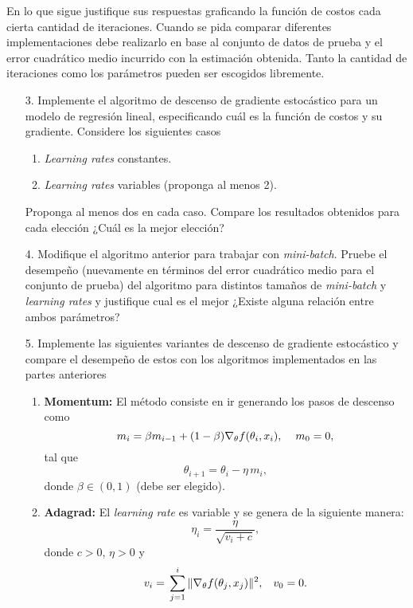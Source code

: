En lo que sigue justifique sus respuestas graficando la función de costos cada cierta cantidad de iteraciones. Cuando se pida comparar diferentes implementaciones debe realizarlo en base al conjunto de datos de prueba y el error cuadrático medio incurrido con la estimación obtenida. Tanto la cantidad de iteraciones como los parámetros pueden ser escogidos libremente.
\begin{enumerate}
  \item[3.] Implemente el algoritmo de descenso de gradiente estocástico para un modelo de regresión lineal, especificando cuál es la función de costos y su gradiente. Considere los siguientes casos
    \begin{enumerate}
      \item \emph{Learning rates} constantes.
      \item \emph{Learning rates} variables (proponga al menos 2).
    \end{enumerate}
    Proponga al menos dos en cada caso. Compare los resultados obtenidos para cada elección ¿Cuál es la mejor elección?
   
  \item[4.] Modifique el algoritmo anterior para trabajar con \emph{mini-batch}. Pruebe el desempeño (nuevamente en términos del error cuadrático medio para el conjunto de prueba) del algoritmo para distintos tamaños de \emph{mini-batch} y \emph{learning rates} y justifique cual es el mejor ¿Existe alguna relación entre ambos parámetros?
    
  \item[5.] Implemente las siguientes variantes de descenso de gradiente estocástico y compare el desempeño de estos con los algoritmos implementados en las partes anteriores
    \begin{enumerate}
        \item \textbf{Momentum:} El método consiste en ir generando los pasos de descenso como
          \[m_{i} = \beta m_{i-1} + (1-\beta)\nabla_{\theta}f(\theta_i,x_{i}),\hspace{0.4cm}m_0 = 0, \]
        tal que
        \[\theta_{i+1} = \theta_i -\eta\, m_i,\]
        donde $\beta\in(0,1)$ (debe ser elegido).
      \item \textbf{Adagrad:} El \emph{learning rate} es variable y se genera de la siguiente manera:
          \[\eta_{i} = \frac{\eta}{\sqrt{v_{i
          } + c}}, \]
        donde $c>0$, $\eta>0$ y 
        \begin{align*}
          v_{i} ={}& \sum_{j = 1}^{i}\|\nabla_{\theta}f(\theta_j,x_j)\|^2, \hspace{0.3cm}v_0 = 0.\\
        \end{align*}
    \end{enumerate}
    
\end{enumerate}

